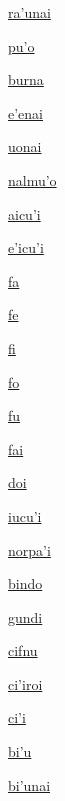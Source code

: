 {\hyperlink{val:rahunai}{ra'unai}}{}{}{}

{\hyperlink{val:puho}{pu'o}}{}{}{}

{\hyperlink{val:burna}{burna}}{}{}{}

{\hyperlink{val:ehenai}{e'enai}}{}{}{}

{\hyperlink{val:uonai}{uonai}}{}{}{}

{\hyperlink{val:nalmuho}{nalmu'o}}{}{}{}

{\hyperlink{val:aicuhi}{aicu'i}}{}{}{}

{\hyperlink{val:ehicuhi}{e'icu'i}}{}{}{}

{\hyperlink{val:fa}{fa}}{}{}{}

{\hyperlink{val:fe}{fe}}{}{}{}

{\hyperlink{val:fi}{fi}}{}{}{}

{\hyperlink{val:fo}{fo}}{}{}{}

{\hyperlink{val:fu}{fu}}{}{}{}

{\hyperlink{val:fai}{fai}}{}{}{}

{\hyperlink{val:doi}{doi}}{}{}{}

{\hyperlink{val:iucuhi}{iucu'i}}{}{}{}

{\hyperlink{val:norpahi}{norpa'i}}{}{}{}

{\hyperlink{val:bindo}{bindo}}{}{}{}

{\hyperlink{val:gundi}{gundi}}{}{}{}

{\hyperlink{val:cifnu}{cifnu}}{}{}{}

{\hyperlink{val:cihiroi}{ci'iroi}}{}{}{}

{\hyperlink{val:cihi}{ci'i}}{}{}{}

{\hyperlink{val:bihu}{bi'u}}{}{}{}

{\hyperlink{val:bihunai}{bi'unai}}{}{}{}

